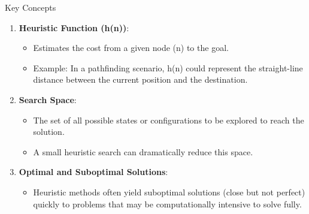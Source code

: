 \documentclass[aspectratio=169]{beamer}
\begin{document}
\begin{frame}[fragile]{Key Concepts}
    \begin{enumerate}
        \item \textbf{Heuristic Function (h(n))}:
        \begin{itemize}
            \item Estimates the cost from a given node (n) to the goal.
            \item Example: In a pathfinding scenario, h(n) could represent the straight-line distance between the current position and the destination.
        \end{itemize}

        \item \textbf{Search Space}:
        \begin{itemize}
            \item The set of all possible states or configurations to be explored to reach the solution.
            \item A small heuristic search can dramatically reduce this space.
        \end{itemize}

        \item \textbf{Optimal and Suboptimal Solutions}:
        \begin{itemize}
            \item Heuristic methods often yield suboptimal solutions (close but not perfect) quickly to problems that may be computationally intensive to solve fully.
        \end{itemize}
    \end{enumerate}
\end{frame}
\end{document}
